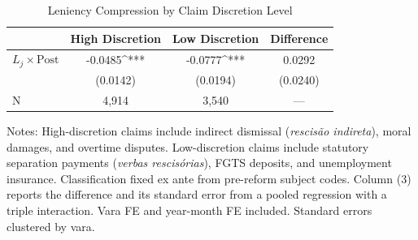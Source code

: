 \begin{table}[t]
\centering
\caption{Leniency Compression by Claim Discretion Level}
\label{tab:heterogeneity}
\begin{tabular}{lccc}
\hline\hline
 & High Discretion & Low Discretion & Difference \\
\hline
$L_j \times \text{Post}$ & -0.0485^{***} & -0.0777^{***} & 0.0292 \\
 & (0.0142) & (0.0194) & (0.0240) \\
\hline
N & 4,914 & 3,540 & --- \\
\hline\hline
\end{tabular}
\begin{flushleft}\small
Notes: High-discretion claims include indirect dismissal (\textit{rescis\~{a}o indireta}), moral damages, and overtime disputes. Low-discretion claims include statutory separation payments (\textit{verbas rescis\'orias}), FGTS deposits, and unemployment insurance. Classification fixed ex ante from pre-reform subject codes. Column (3) reports the difference and its standard error from a pooled regression with a triple interaction. Vara FE and year-month FE included. Standard errors clustered by vara.
\end{flushleft}
\end{table}
